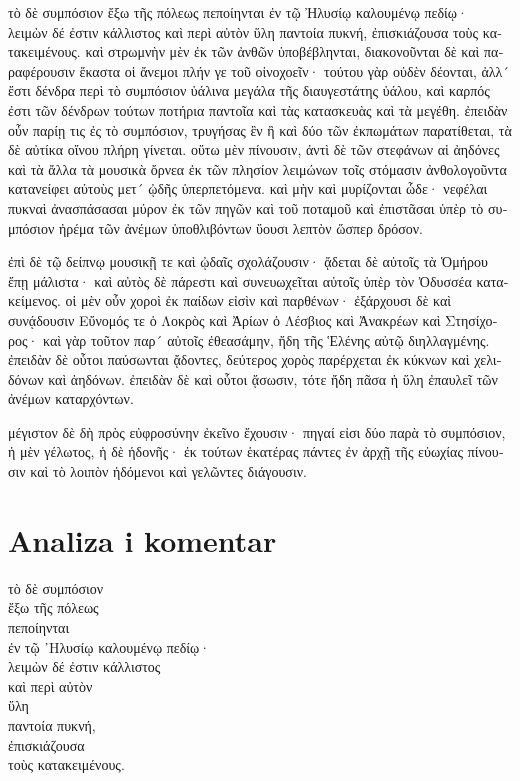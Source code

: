 {\large

\begin{greek}

\noindent τὸ δὲ συμπόσιον ἔξω τῆς πόλεως πεποίηνται ἐν τῷ Ἠλυσίῳ καλουμένῳ πεδίῳ· λειμὼν δέ ἐστιν κάλλιστος καὶ περὶ αὐτὸν ὕλη παντοία πυκνή, ἐπισκιάζουσα τοὺς κατακειμένους. καὶ στρωμνὴν μὲν ἐκ τῶν ἀνθῶν ὑποβέβληνται, διακονοῦνται δὲ καὶ παραφέρουσιν ἕκαστα οἱ ἄνεμοι πλήν γε τοῦ οἰνοχοεῖν· τούτου γὰρ οὐδὲν δέονται, ἀλλ´ ἔστι δένδρα περὶ τὸ συμπόσιον ὑάλινα μεγάλα τῆς διαυγεστάτης ὑάλου, καὶ καρπός ἐστι τῶν δένδρων τούτων ποτήρια παντοῖα καὶ τὰς κατασκευὰς καὶ τὰ μεγέθη. ἐπειδὰν οὖν παρίῃ τις ἐς τὸ συμπόσιον, τρυγήσας ἓν ἢ καὶ δύο τῶν ἐκπωμάτων παρατίθεται, τὰ δὲ αὐτίκα οἴνου πλήρη γίνεται. οὕτω μὲν πίνουσιν, ἀντὶ δὲ τῶν στεφάνων αἱ ἀηδόνες καὶ τὰ ἄλλα τὰ μουσικὰ ὄρνεα ἐκ τῶν πλησίον λειμώνων τοῖς στόμασιν ἀνθολογοῦντα κατανείφει αὐτοὺς μετ´ ᾠδῆς ὑπερπετόμενα. καὶ μὴν καὶ μυρίζονται ὧδε· νεφέλαι πυκναὶ ἀνασπάσασαι μύρον ἐκ τῶν πηγῶν καὶ τοῦ ποταμοῦ καὶ ἐπιστᾶσαι ὑπὲρ τὸ συμπόσιον ἠρέμα τῶν ἀνέμων ὑποθλιβόντων ὕουσι λεπτὸν ὥσπερ δρόσον.

\noindent ἐπὶ δὲ τῷ δείπνῳ μουσικῇ τε καὶ ᾠδαῖς σχολάζουσιν· ᾄδεται δὲ αὐτοῖς τὰ Ὁμήρου ἔπῃ μάλιστα· καὶ αὐτὸς δὲ πάρεστι καὶ συνευωχεῖται αὐτοῖς ὑπὲρ τὸν Ὀδυσσέα κατακείμενος. οἱ μὲν οὖν χοροὶ ἐκ παίδων εἰσὶν καὶ παρθένων· ἐξάρχουσι δὲ καὶ συνᾴδουσιν Εὔνομός τε ὁ Λοκρὸς καὶ Ἀρίων ὁ Λέσβιος καὶ Ἀνακρέων καὶ Στησίχορος· καὶ γὰρ τοῦτον παρ´ αὐτοῖς ἐθεασάμην, ἤδη τῆς Ἑλένης αὐτῷ διηλλαγμένης. ἐπειδὰν δὲ οὗτοι παύσωνται ᾄδοντες, δεύτερος χορὸς παρέρχεται ἐκ κύκνων καὶ χελιδόνων καὶ ἀηδόνων. ἐπειδὰν δὲ καὶ οὗτοι ᾄσωσιν, τότε ἤδη πᾶσα ἡ ὕλη ἐπαυλεῖ τῶν ἀνέμων καταρχόντων.

\noindent μέγιστον δὲ δὴ πρὸς εὐφροσύνην ἐκεῖνο ἔχουσιν· πηγαί εἰσι δύο παρὰ τὸ συμπόσιον, ἡ μὲν γέλωτος, ἡ δὲ ἡδονῆς· ἐκ τούτων ἑκατέρας πάντες ἐν ἀρχῇ τῆς εὐωχίας πίνουσιν καὶ τὸ λοιπὸν ἡδόμενοι καὶ γελῶντες διάγουσιν.

\end{greek}

}


\section*{Analiza i komentar}


{\large
\begin{greek}
\noindent τὸ δὲ συμπόσιον \\
 \tabto{2em} ἔξω τῆς πόλεως \\
πεποίηνται \\
\tabto{2em} ἐν τῷ ᾿Ηλυσίῳ καλουμένῳ πεδίῳ· \\
\tabto{4em} λειμὼν δέ ἐστιν κάλλιστος \\
\tabto{4em} καὶ περὶ αὐτὸν \\
\tabto{4em} ὕλη \\
\tabto{6em} παντοία πυκνή, \\
\tabto{6em} ἐπισκιάζουσα \\
\tabto{8em} τοὺς κατακειμένους. \\

\end{greek}
}

